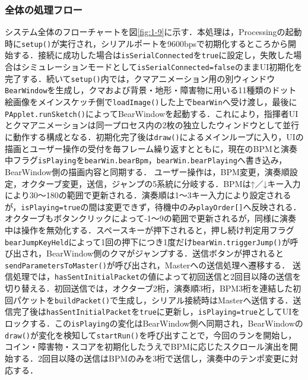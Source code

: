 \documentclass[uplatex,dvipdfmx]{jlreq}
\begin{document}
\subsubsection{全体の処理フロー}
システム全体のフローチャートを図\ref{fig:1-9}に示す．本処理は，Processingの起動時に\texttt{setup()}が実行され，シリアルポートを9600bpsで初期化するところから開始する．接続に成功した場合は\texttt{isSerialConnected}を\texttt{true}に設定し，失敗した場合はシミュレーションモードとして\texttt{isSerialConnected=false}のままUI初期化を完了する．続いて\texttt{setup()}内では，クマアニメーション用の別ウィンドウ\texttt{BearWindow}を生成し，クマおよび背景・地形・障害物に用いる11種類のドット絵画像をメインスケッチ側で\texttt{loadImage()}した上で\texttt{bearWin}へ受け渡し，最後に\texttt{PApplet.runSketch()}によってBearWindowを起動する．これにより，指揮者UIとクマアニメーションは同一プロセス内の2枚の独立したウィンドウとして並行に動作する構成となる．初期化完了後は\texttt{draw()}によるメインループに入り，UIの描画とユーザー操作の受付を毎フレーム繰り返すとともに，現在のBPMと演奏中フラグ\texttt{isPlaying}を\texttt{bearWin.bearBpm}，\texttt{bearWin.bearPlaying}へ書き込み，BearWindow側の描画内容と同期する．
ユーザー操作は，BPM変更，演奏順設定，オクターブ変更，送信，ジャンプの5系統に分岐する．BPMは↑／↓キー入力により30〜180の範囲で更新される．演奏順は1〜3キー入力により設定されるが，\texttt{isPlaying=true}の間は変更できず，待機中のみ\texttt{playOrder[]}へ反映される．オクターブもボタンクリックによって-1〜9の範囲で更新されるが，同様に演奏中は操作を無効化する．スペースキーが押下されると，押し続け判定用フラグ\texttt{bearJumpKeyHeld}によって1回の押下につき1度だけ\texttt{bearWin.triggerJump()}が呼び出され，BearWindow側のクマがジャンプする．送信ボタンが押されると\texttt{sendParametersToMaster()}が呼び出され，Masterへの送信処理へ遷移する．
送信処理では，\texttt{hasSentInitialPacket}の値によって初回送信と2回目以降の送信を切り替える．初回送信では，オクターブ2桁，演奏順3桁，BPM3桁を連結した初回パケットを\texttt{buildPacket()}で生成し，シリアル接続時はMasterへ送信する．送信完了後は\texttt{hasSentInitialPacket}を\texttt{true}に更新し，\texttt{isPlaying=true}としてUIをロックする．この\texttt{isPlaying}の変化はBearWindow側へ同期され，BearWindowの\texttt{draw()}が変化を検知して\texttt{startRun()}を呼び出すことで，今回のランを開始し，コイン・障害物・スコアを初期化したうえでBPMに応じたスクロール演出を開始する．2回目以降の送信はBPMのみを3桁で送信し，演奏中のテンポ変更に対応する．
\end{document}
